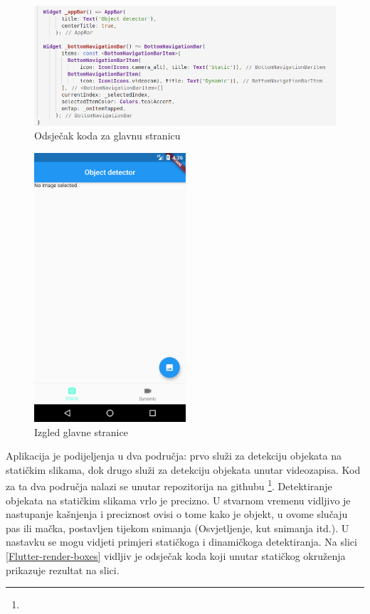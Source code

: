 \begin{figure}[htb]
    \centering
    \includegraphics[width=14cm]{img/flutter-main.png}
    \caption{Odsječak koda za glavnu stranicu}
    \label{Flutter-main}
\end{figure}


\begin{figure}[htb]
    \centering
    \includegraphics[height=10cm]{img/flutter-main-impl.png}
    \caption{Izgled glavne stranice}
    \label{Flutter-main-impl}
\end{figure}

Aplikacija je podijeljenja u dva područja: prvo služi za detekciju objekata na statičkim slikama, dok drugo služi za detekciju objekata unutar videozapisa. Kod za ta dva područja nalazi se unutar repozitorija na githubu \footnote{}.
Detektiranje objekata na statičkim slikama vrlo je precizno. U stvarnom vremenu vidljivo je nastupanje kašnjenja i preciznost ovisi o tome 
kako je objekt, u ovome slučaju pas ili mačka, postavljen tijekom snimanja (Osvjetljenje, kut snimanja itd.). U nastavku se mogu vidjeti primjeri statičkoga i dinamičkoga detektiranja. Na slici \ref{Flutter-render-boxes} vidljiv je odsječak koda koji
unutar statičkog okruženja prikazuje rezultat na slici.

